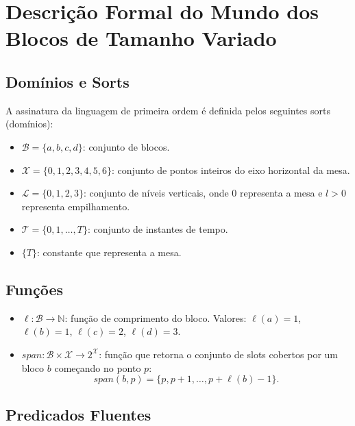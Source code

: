 \documentclass[12pt,a4paper]{article}
\begin{document}
\section{Descrição Formal do Mundo dos Blocos de Tamanho Variado}
\label{sec:lpo}

\subsection{Domínios e Sorts}

A assinatura da linguagem de primeira ordem é definida pelos seguintes sorts (domínios):

\begin{itemize}[leftmargin=1.2cm]
    \item $\mathcal{B} = \{a, b, c, d\}$: conjunto de blocos.
    \item $\mathcal{X} = \{0, 1, 2, 3, 4, 5, 6\}$: conjunto de pontos inteiros do eixo horizontal da mesa.
    \item $\mathcal{L} = \{0, 1, 2, 3\}$: conjunto de níveis verticais, onde $0$ representa a mesa e $l > 0$ representa empilhamento.
    \item $\mathcal{T} = \{0, 1, \dots, T\}$: conjunto de instantes de tempo.
    \item $\{T\}$: constante que representa a mesa.
\end{itemize}

\subsection{Funções}

\begin{itemize}[leftmargin=1.2cm]
    \item $\ell : \mathcal{B} \to \mathbb{N}$: função de comprimento do bloco. Valores: $\ell(a)=1$, $\ell(b)=1$, $\ell(c)=2$, $\ell(d)=3$.
    \item $span : \mathcal{B} \times \mathcal{X} \to 2^{\mathcal{X}}$: função que retorna o conjunto de slots cobertos por um bloco $b$ começando no ponto $p$:
    \[
    span(b,p) = \{p, p+1, \dots, p+\ell(b)-1\}.
    \]
\end{itemize}

\subsection{Predicados Fluentes}
\end{document}
